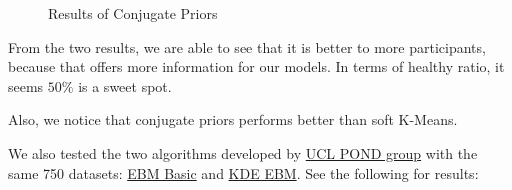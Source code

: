 \documentclass[
  letterpaper,
  DIV=11,
  numbers=noendperiod]{scrreprt}
\begin{document}
\begin{figure}


\caption{\label{fig-res-conjugate-priors}Results of Conjugate Priors}

\end{figure}%

From the two results, we are able to see that it is better to more
participants, because that offers more information for our models. In
terms of healthy ratio, it seems \(50\%\) is a sweet spot.

Also, we notice that conjugate priors performs better than soft K-Means.

We also tested the two algorithms developed by
\href{https://ucl-pond.github.io/}{UCL POND group} with the same 750
datasets: \href{https://github.com/ucl-pond/ebm}{EBM Basic} and
\href{https://github.com/ucl-pond/kde_ebm}{KDE EBM}. See the following
for results:
\end{document}
